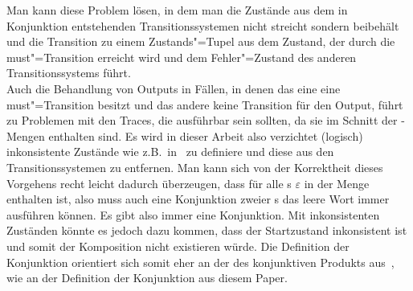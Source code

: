 Man kann diese Problem lösen, in dem man die Zustände aus dem in Konjunktion
entstehenden Transitionssystemen nicht streicht sondern beibehält und die
Transition zu einem Zustands"=Tupel aus dem Zustand, der durch die
must"=Transition erreicht wird und dem Fehler"=Zustand des anderen
Transitionssystems führt.\\
Auch die Behandlung von Outputs in Fällen, in denen das eine \MEIO{} eine
must"=Transition besitzt und das andere keine Transition für den Output, führt
zu Problemen mit den Traces, die ausführbar sein sollten, da sie im Schnitt der
\EL{}-Mengen enthalten sind. Es wird in dieser Arbeit also verzichtet (logisch)
inkonsistente Zustände wie z.B.\ in~\cite{Vog2016MIA3} zu definiere und diese
aus den Transitionssystemen zu entfernen. Man kann sich von der Korrektheit
dieses Vorgehens recht leicht dadurch überzeugen, dass für alle \MEIO{}s
$\varepsilon$ in der Menge \EL{} enthalten ist, also muss auch eine Konjunktion
zweier \MEIO{}s das leere Wort immer ausführen können. Es gibt also immer eine
Konjunktion. Mit inkonsistenten Zuständen könnte es jedoch dazu kommen, dass
der Startzustand inkonsistent ist und somit der Komposition nicht existieren
würde. Die Definition der Konjunktion orientiert sich somit eher an der des
konjunktiven Produkts aus~\cite{Vogler2016MIA3}, wie an der Definition der
Konjunktion aus diesem Paper.

